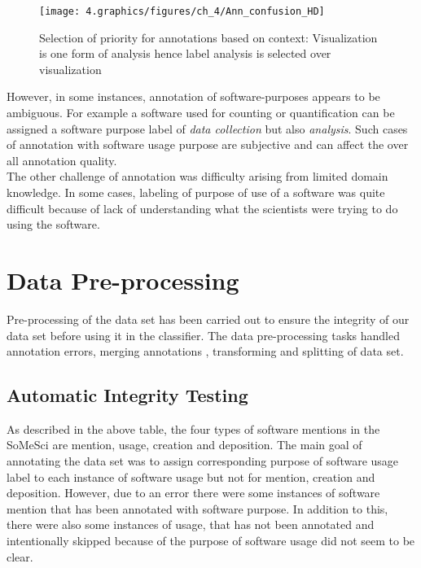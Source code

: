 \begin{figure}[htbp]
	\centering
	\texttt{[image: 4.graphics/figures/ch\_4/Ann\_confusion\_HD]}
	\caption{Selection of priority for annotations based on context: Visualization is one form of analysis hence label analysis is selected over visualization }
	\label{fig:chapter04:setup}
\end{figure}

However, in some instances, annotation of software-purposes appears to be ambiguous. For example a software used for counting or quantification can be assigned a software purpose label of  \emph{data collection} but also \emph{analysis}. Such cases of annotation with software usage purpose are subjective and can affect the over all annotation quality.\\

The other challenge of annotation was difficulty arising from limited domain knowledge. In some cases, labeling of purpose of use of a software was quite difficult because of lack of understanding what the scientists were trying to do using the software.

\section{Data Pre-processing}
\label{sec:dataset:preprocessing}
Pre-processing of the data set has been carried out to ensure the integrity of our data set before using it in the classifier. The data pre-processing tasks handled annotation errors, merging annotations , transforming and splitting of data set. 

\subsection{Automatic Integrity Testing }
\label{subsec:dataset:preprocessing:handlingerrors}

As described in the above table, the four types of software mentions in the SoMeSci are mention, usage, creation and deposition. The main goal of annotating the data set was to assign corresponding purpose of software usage label to each instance of software usage but not for mention, creation and deposition. However, due to an error there were some instances of software mention that has been annotated with software purpose. In addition to this, there were also some instances of usage, that has not been annotated and intentionally skipped because of the purpose of software usage did not seem to be clear. \\

